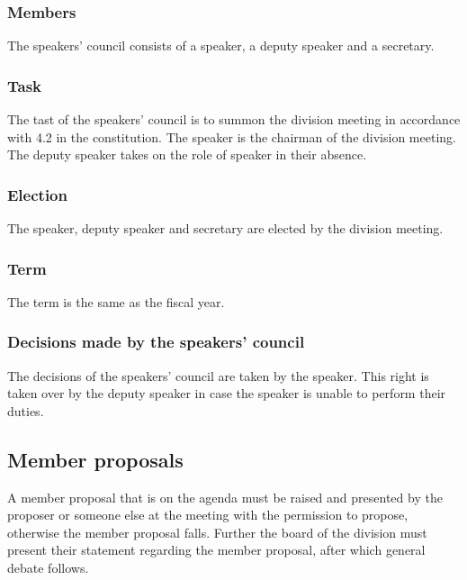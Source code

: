 \subsubsection{Members}
The speakers' council consists of a speaker, a deputy speaker and a secretary.
\subsubsection{Task}
The tast of the speakers' council is to summon the division meeting in accordance with 4.2 in the constitution. The speaker is the chairman of the division meeting. The deputy speaker takes on the role of speaker in their absence. 

\subsubsection{Election}
The speaker, deputy speaker and secretary are elected by the division meeting. 

\subsubsection{Term}
The term is the same as the fiscal year. 

\subsubsection{Decisions made by the speakers' council}
The decisions of the speakers' council are taken by the speaker. This right is taken over by the deputy speaker in case the speaker is unable to perform their duties.

\subsection{Member proposals} 
A member proposal that is on the agenda must be raised and presented by the proposer or someone else at the meeting with the permission to propose, otherwise the member proposal falls. Further the board of the division must present their statement regarding the member proposal, after which general debate follows.  

\newpage
